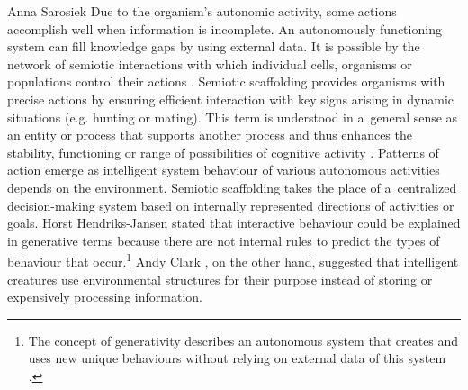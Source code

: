 \begin{artengenv}{Anna Sarosiek}
Due to the organism’s autonomic activity, some actions accomplish well when information is incomplete. An autonomously functioning system can fill knowledge gaps by using external data. It is possible by the network of semiotic interactions with which individual cells, organisms or populations control their actions
\parencite[][]{kull_evolution_2015}. %
 Semiotic scaffolding provides organisms with precise actions by ensuring efficient interaction with key signs arising in dynamic situations (e.g. hunting or mating). This term is understood in a~general sense as an entity or process that supports another process and thus enhances the stability, functioning or range of possibilities of cognitive activity 
\parencite[][p.29]{emmeche_reading_2002}. %
 Patterns of action emerge as intelligent system behaviour of various autonomous activities depends on the environment. Semiotic scaffolding takes the place of a~centralized decision-making system based on internally represented directions of activities or goals. Horst Hendriks-Jansen stated that interactive behaviour could be explained in generative terms because there are not internal rules to predict the types of behaviour that occur.\footnote{The concept of generativity describes an autonomous system that creates and uses new unique behaviours without relying on external data of this system 
\parencite[][p.9]{hendriks-jansen_catching_1996}.%
} Andy Clark 
\parencite*[][p.46]{clark_being_1997},%
 on the other hand, suggested that intelligent creatures use environmental structures for their purpose instead of storing or expensively processing information.


\end{artengenv}
